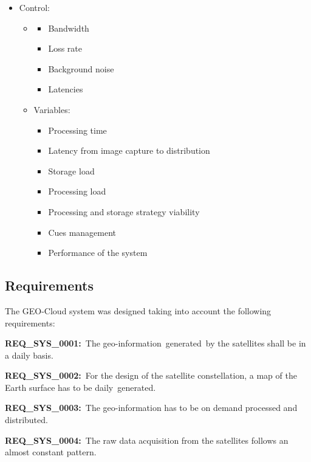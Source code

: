 \documentclass[a4paper]{article}
\newcommand\liststyleLFOxxxix{%
\renewcommand\labelitemi{[F0B7?]}
\renewcommand\labelitemii{[F0B7?]}
\renewcommand\labelitemiii{o}
\renewcommand\labelitemiv{[F0B7?]}
}
\begin{document}
\liststyleLFOxxxix
\begin{itemize}
\item Control:

\begin{itemize}
\item \begin{itemize}
\item Bandwidth
\item Loss rate
\item Background noise
\item Latencies
\end{itemize}
\item Variables:

\begin{itemize}
\item Processing time
\item Latency from image capture to distribution
\item Storage load
\item Processing load
\item Processing and storage strategy viability
\item Cues management
\item Performance of the system
\end{itemize}
\end{itemize}
\end{itemize}
\subsection[Requirements]{Requirements}
\hypertarget{Toc378868691}{}
\bigskip

The GEO-Cloud system was designed taking into account the following
requirements:


\bigskip

\textbf{REQ\_SYS\_0001:}\ The geo-information\ generated\ by the
satellites shall be in a daily basis.


\bigskip

\textbf{REQ\_SYS\_0002:}\ For the design of the satellite constellation,
a map of the Earth surface has to be daily\ generated.


\bigskip

\textbf{REQ\_SYS\_0003:}\ The geo-information has to be on demand
processed and distributed.


\bigskip

\textbf{REQ\_SYS\_0004:}\ The raw data acquisition from the satellites
follows an almost constant pattern.\ 
\end{document}
